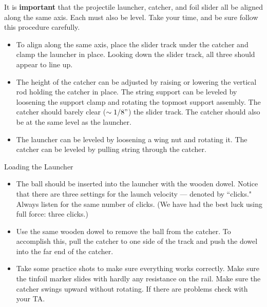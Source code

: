 It is {\bf important} that the projectile launcher, catcher, and foil
slider all be aligned along the same axis.  Each must also be
level.  Take your time, and be sure follow this procedure carefully.

	\begin{itemize}

	\item  To align along the same axis, place the slider track
	under the catcher and clamp the launcher in place.  Looking
         down the slider track, all three should appear to line up.
	
	\item The height of the catcher can be adjusted by raising or
	lowering the vertical rod holding the catcher in place. 
       The string support 
        can be leveled by loosening the support clamp and rotating the
        topmost support assembly.  The
	catcher should barely clear ($\sim 1/8"$) the slider
	track.  The catcher should also be at the same level as the
	launcher.
	
	\item The launcher can be leveled by loosening a wing nut
and rotating it.
	The catcher can be leveled
        by pulling string through the catcher.  
	
	\end{itemize}


\item Loading the Launcher

	\begin{itemize}

	\item The ball should be inserted into the launcher with the
        wooden dowel.  Notice that there are three settings for the launch
        velocity --- denoted by ``clicks."  Always listen for the same number of clicks.
        (We have had the best luck using full force: three clicks.)

	\item  Use the same wooden dowel to remove the ball from the
        catcher.  To accomplish this, pull the catcher to one side of
        the track and push the dowel into the far end of the catcher.
	
	\item Take some practice shots to make sure everything works
        correctly.  Make sure the tinfoil marker slides with hardly
        any resistance on the rail.  Make sure the catcher swings
        upward without rotating.  If there are problems check with
        your TA.
	
	\end{itemize}



